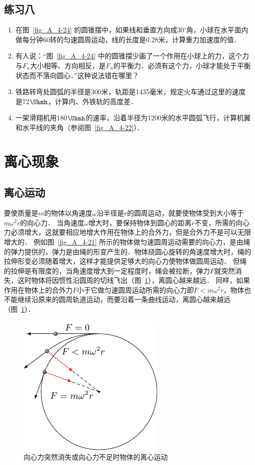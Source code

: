 \subsection*{练习八}
\begin{enumerate}
	\item 在图~\ref{fig_A_4-24} 的圆锥摆中，如果线和垂直方向成30$^\circ$角，小球在水平面内做每分钟60转的匀速圆周运动，线的长度是0.28米，计算重力加速度的值．
\item 有人说：“图~\ref{fig_A_4-24} 中的圆锥摆少画了一个作用在小球上的力，这个力与$F_n$大小相等、方向相反，是$F_n$的平衡力．必须有这个力，小球才能处于平衡状态而不落向圆心．”这种说法错在哪里？
\item 铁路转弯处圆弧的半径是300米，轨距是1435毫米，规定火车通过这里的速度是72$\Ukmh$，计算内、外铁轨的高度差．
\item 一架滑翔机用180$\Ukmh$的速率，沿着半径为1200米的水平圆弧飞行，计算机翼和水平线的夹角（参阅图~\ref{fig_A_4-22}）．
\end{enumerate}

\section{离心现象}
\subsection{离心运动} 

要使质量是$m$的物体以角速度$\omega$沿半径是$r$的圆周运动，就要使物体受到大小等于$m\omega^2r$的向心力．
当角速度$\omega$增大时，要保持物体到圆心的距离$r$不变，所需的向心力必须增大，这就要相应地增大作用在物体上的合外力，但是合外力不是可以无限增大的．
例如图~\ref{fig_A_4-21} 所示的物体做匀速圆周运动需要的向心力，是由绳的弹力提供的，弹力是由绳的形变产生的．物体绕圆心旋转的角速度增大时，绳的拉伸形变必须随着增大，这样才能提供足够大的向心力使物体做圆周运动．
但绳的拉伸是有限度的，当角速度增大到一定程度时，绳会被拉断，弹力$F$就突然消失，这时物体将因惯性沿圆周的切线飞出（图~\ref{fig_A_4-28}），离圆心越来越远．
同样，如果作用在物体上的合外力$F$小于它做匀速圆周运动所需的向心力即$F<m\omega^2 r$，物体也不能继续沿原来的圆周轨道运动，而要沿着一条曲线运动，离圆心越来越远（图~\ref{fig_A_4-28}）．
\begin{figure}[htbp]
    \centering
    \includegraphics{fig/A/4-28.pdf}
    \caption{向心力突然消失或向心力不足时物体的离心运动}\label{fig_A_4-28}
\end{figure}


